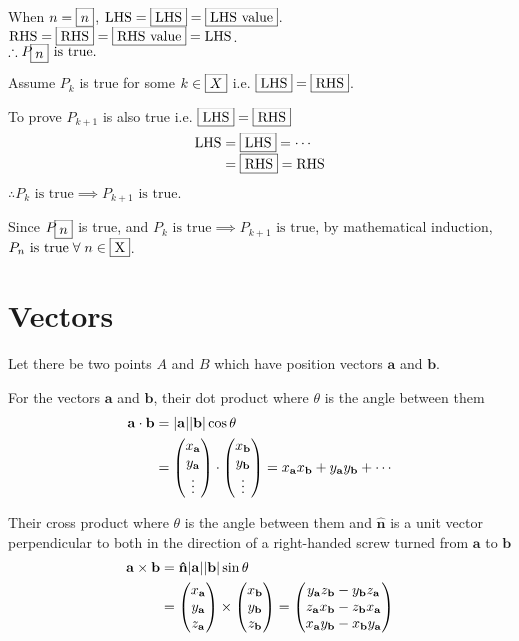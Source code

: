\documentclass{slnotes}
\newcommand*{\slbx}[1]{{\ifmmode\smash{\boxed{#1\vphantom{X}}}\else\smash{\fbox{#1\vphantom{X}}}\fi}}
\newcommand*{\ve}[1]{\mathbf{#1}}
\newcommand*\cve[3][]{\begin{pmatrix}\ifx\relax#1\relax\else#1\\\fi#2\\#3\end{pmatrix}}
\begin{document}
\begin{tabbing}
When \(n = \slbx{n}\), \=\(\text{LHS} = \slbx{\text{LHS}} = \slbx{\text{LHS value}}\).\\
\>\(\text{RHS} = \slbx{\text{RHS}} = \slbx{\text{RHS value}} = \text{LHS}\).\\
\>\(\mathrel\therefore P_\slbx{n}\text{ is true.}\)\\
\end{tabbing}

Assume \(P_k\) is true for some \(k \in \slbx{X}\) i.e. \(\slbx{\text{LHS}} = \slbx{\text{RHS}}\).

To prove \(P_{k+1}\) is also true i.e. \(\slbx{\text{LHS}} = \slbx{\text{RHS}}\) \begin{align*}\text{LHS} &= \slbx{\text{LHS}} = \cdots\\&= \slbx{\text{RHS}} = \text{RHS}\end{align*} \(\mathrel\therefore P_k\text{ is true} \implies P_{k+1}\text{ is true}\).

Since \(P_\slbx{n}\) is true, and \(P_k\text{ is true} \implies P_{k+1}\text{ is true}\), by mathematical induction, \(P_n\text{ is true}\mathrel\forall n \in \slbx{\mathrm X}\).
\chapter{Vectors}
Let there be two points \(A\) and \(B\) which have position vectors \(\ve a\) and \(\ve b\).

For the vectors \(\ve a\) and \(\ve b\), their dot product where \(\theta\) is the angle between them \begin{align*}\ve a \cdot \ve b &= |\ve a||\ve b|\cos\theta\\&=\cve[x_{\ve a}]{y_{\ve a}}{\vdots} \cdot \cve[x_{\ve b}]{y_{\ve b}}{\vdots} = x_{\ve a}x_{\ve b} + y_{\ve a}y_{\ve b} + \cdots\end{align*}

Their cross product where \(\theta\) is the angle between them and \(\ve{\hat n}\) is a unit vector perpendicular to both in the direction of a right-handed screw turned from \(\ve a\) to \(\ve b\) \begin{align*}\ve a \times \ve b &= \ve{\hat n}|\ve a||\ve b|\sin\theta\\&= \cve[x_{\ve a}]{y_{\ve a}}{z_{\ve a}} \times \cve[x_{\ve b}]{y_{\ve b}}{z_{\ve b}} = \cve[y_{\ve a}z_{\ve b} - y_{\ve b}z_{\ve a}]{z_{\ve a}x_{\ve b} - z_{\ve b}x_{\ve a}}{x_{\ve a}y_{\ve b} - x_{\ve b}y_{\ve a}}\end{align*}
\end{document}
